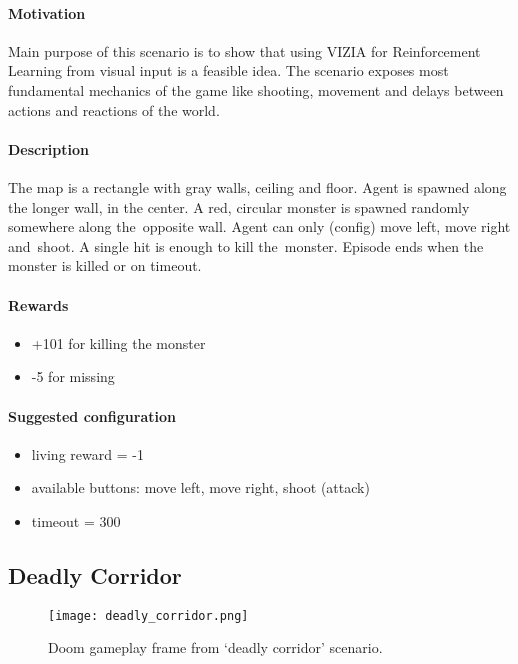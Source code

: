 		\paragraph{Motivation}
			Main purpose of this scenario is to show that using VIZIA for Reinforcement Learning from visual input is a feasible idea. The scenario exposes most fundamental mechanics of the game like shooting, movement and delays between actions and reactions of the world.
		
		\paragraph{Description}
			The map is a rectangle with gray walls, ceiling and floor. Agent is spawned along the longer wall, in the center. A red, circular monster is spawned randomly somewhere along the~opposite wall. Agent can only (config) move left, move right and~shoot. A single hit is enough to kill the~monster. Episode ends when the monster is killed or on timeout.
		
		\paragraph{Rewards}
			\begin{itemize}
				\item +101 for killing the monster
				\item -5 for missing
			\end{itemize}
		
		\paragraph{Suggested configuration}
			\begin{itemize}
				\item living reward = -1
				\item available buttons: move left, move right, shoot (attack)
				\item timeout = 300
			\end{itemize}
	\newpage

	\subsection{Deadly Corridor}
		\begin{figure}
			\centering
			\texttt{[image: deadly\_corridor.png]}
			\caption{Doom gameplay frame from `deadly corridor' scenario.}\label{fig:deadly_corridor}
		\end{figure}

